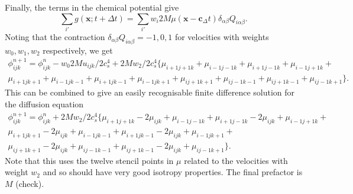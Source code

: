 Finally, the terms in the chemical potential give
\begin{equation}
\sum_{i'} g(\mathbf{x};t + \Delta t) =
\sum_{i'} w_i 2M\mu(\mathbf{x} - \mathbf{c}_ \Delta t)
\delta_{\alpha\beta} Q_{i\alpha\beta}.
\end{equation}
Noting that the contraction $\delta_{\alpha\beta} Q_{i\alpha\beta} =
-1, 0, 1$ for velocities with weights $w_0, w_1, w_2$ respectively,
we get
\begin{eqnarray}
\phi_{ijk}^{n+1} = \phi_{ijk}^n -  w_0 2M u_{ijk}/2c_s^4
+ 2M w_2/2c_s^4 \Big\{
\mu_{i+1 j+1 k} + \mu_{i-1 j-1 k} + \mu_{i+1 j-1 k} + \mu_{i-1 j+1 k} + \\
\mu_{i+1 j k+1} + \mu_{i-1 j k-1} + \mu_{i+1 j k-1} + \mu_{i-1 j k+1} +
\mu_{i j+1 k+1} + \mu_{i j-1 k-1} + \mu_{i j+1 k-1} + \mu_{i j-1 k+1} \Big\}.
\end{eqnarray}
This can be combined to give an easily recognisable finite difference
solution for the diffusion equation
\begin{eqnarray}
\phi_{ijk}^{n+1} = \phi_{ijk}^n + 2M w_2 / 2 c_s^4
\Big\{
\mu_{i+1 j+1 k} - 2\mu_{ijk} + \mu_{i-1 j-1 k} + 
\mu_{i+1 j-1 k} - 2\mu_{ijk} + \mu_{i-1 j+1 k} + \\
\mu_{i+1 j k+1} - 2\mu_{ijk} + \mu_{i-1 j k-1} +
\mu_{i+1 j k-1} - 2\mu_{ijk} + \mu_{i-1 j k+1} + \\
\mu_{i j+1 k+1} - 2\mu_{ijk} + \mu_{i j-1 k-1} + 
\mu_{i j+1 k-1} - 2\mu_{ijk} + \mu_{i j-1 k+1} \Big\}.
\end{eqnarray}
Note that this uses the twelve stencil points in $\mu$ related to
the velocities with weight $w_2$ and so should have very good isotropy
properties. The final prefactor is $M$ (check).
